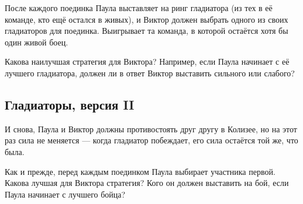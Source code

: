 После каждого поединка Паула выставляет на ринг гладиатора (из тех в её команде, кто ещё остался в живых), и Виктор должен выбрать одного из своих гладиаторов для поединка.
Выигрывает та команда, в которой остаётся хотя бы один живой боец.

\medskip

Какова наилучшая стратегия для Виктора?
Например, если Паула начинает с её лучшего гладиатора, должен ли в ответ Виктор выставить сильного или слабого?

\subsection*{Гладиаторы, версия II} %

И снова, Паула и Виктор должны противостоять друг другу в Колизее, но на этот раз сила не меняется --- когда гладиатор побеждает, его сила остаётся той же, что была. %

\medskip

Как и прежде, перед каждым поединком Паула выбирает участника первой.
Какова лучшая для Виктора стратегия? Кого он должен выставить на бой, если Паула начинает с лучшего бойца?
